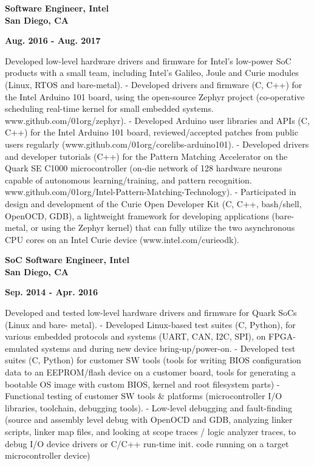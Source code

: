 \documentclass[6pt]{article}
\begin{document}
\hspace*{-\parindent}%
\begin{minipage}{20em}
{\bfseries Software Engineer, Intel \\
San Diego, CA}
\end{minipage}
\hfill
\begin{minipage}{12em}
{
    \bfseries \hfill Aug. 2016 - Aug. 2017 \\

}
\end{minipage}
\break
\break
Developed low-level hardware drivers and firmware for Intel's low-power SoC products
with a small team, including Intel's Galileo, Joule and Curie modules (Linux, RTOS and
bare-metal).
- Developed drivers and firmware (C, C++) for the Intel Arduino 101 board, using the
open-source Zephyr project (co-operative scheduling real-time kernel for small
embedded systems. www.github.com/01org/zephyr).
- Developed Arduino user libraries and APIs (C, C++) for the Intel Arduino 101 board,
reviewed/accepted patches from public users regularly
(www.github.com/01org/corelibs-arduino101).
- Developed drivers and developer tutorials (C++) for the Pattern Matching Accelerator
on the Quark SE C1000 microcontroller (on-die network of 128 hardware neurons
capable of autonomous learning/training, and pattern recognition.
www.github.com/01org/Intel-Pattern-Matching-Technology).
- Participated in design and development of the Curie Open Developer Kit (C, C++,
bash/shell, OpenOCD, GDB), a lightweight framework for developing applications
(bare-metal, or using the Zephyr kernel) that can fully utilize the two asynchronous
CPU cores on an Intel Curie device (www.intel.com/curieodk).
\break
\break


\hspace*{-\parindent}%
\begin{minipage}{20em}
{\bfseries SoC Software Engineer, Intel \\
San Diego, CA}
\end{minipage}
\hfill
\begin{minipage}{14em}
{
    \bfseries \hfill Sep. 2014 - Apr. 2016 \\

}
\end{minipage}
\break
\break
Developed and tested low-level hardware drivers and firmware for Quark SoCs (Linux and bare-
metal).
- Developed Linux-based test suites (C, Python), for various embedded protocols and
systems (UART, CAN, I2C, SPI), on FPGA-emulated systems and during new device
bring-up/power-on.
- Developed test suites (C, Python) for customer SW tools (tools for writing BIOS
configuration data to an EEPROM/flash device on a customer board, tools for
generating a bootable OS image with custom BIOS, kernel and root filesystem parts)
- Functional testing of customer SW tools \& platforms (microcontroller I/O libraries, toolchain,
debugging tools).
- Low-level debugging and fault-finding (source and assembly level debug with OpenOCD and GDB,
analyzing linker scripts, linker map files, and looking at scope traces / logic analyzer traces, to
debug I/O device drivers or C/C++ run-time init. code running on a target microcontroller device)
\break
\break
\end{document}
